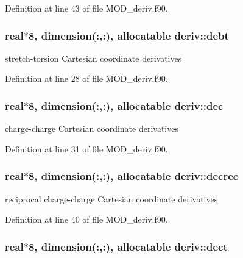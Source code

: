Definition at line 43 of file M\-O\-D\-\_\-deriv.\-f90.

\hypertarget{classderiv_abe7c91d2bc97033c899941792db7828a}{
\subsubsection[{debt}]{\setlength{\rightskip}{0pt plus 5cm}real$\ast$8, dimension(\-:,\-:), allocatable deriv\-::debt}}\label{classderiv_abe7c91d2bc97033c899941792db7828a}


stretch-\/torsion Cartesian coordinate derivatives 



Definition at line 28 of file M\-O\-D\-\_\-deriv.\-f90.

\hypertarget{classderiv_a2ad8ee0f9e05642b554dffbabaea5cdf}{
\subsubsection[{dec}]{\setlength{\rightskip}{0pt plus 5cm}real$\ast$8, dimension(\-:,\-:), allocatable deriv\-::dec}}\label{classderiv_a2ad8ee0f9e05642b554dffbabaea5cdf}


charge-\/charge Cartesian coordinate derivatives 



Definition at line 31 of file M\-O\-D\-\_\-deriv.\-f90.

\hypertarget{classderiv_a95c38bb809e639ed11a368c565cf8627}{
\subsubsection[{decrec}]{\setlength{\rightskip}{0pt plus 5cm}real$\ast$8, dimension(\-:,\-:), allocatable deriv\-::decrec}}\label{classderiv_a95c38bb809e639ed11a368c565cf8627}


reciprocal charge-\/charge Cartesian coordinate derivatives 



Definition at line 40 of file M\-O\-D\-\_\-deriv.\-f90.

\hypertarget{classderiv_a7b4ac4c0cf2f11b15f089149b9755df8}{
\subsubsection[{dect}]{\setlength{\rightskip}{0pt plus 5cm}real$\ast$8, dimension(\-:,\-:), allocatable deriv\-::dect}}\label{classderiv_a7b4ac4c0cf2f11b15f089149b9755df8}


